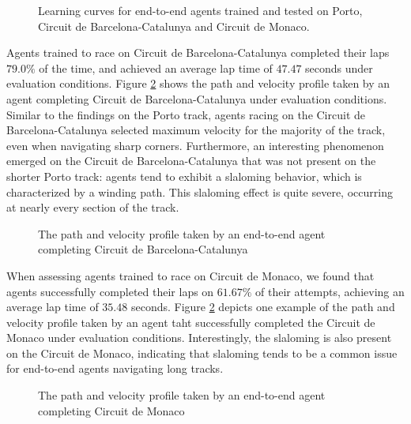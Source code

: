 \begin{figure}[htb!]
    \centering
    
    \caption[Learning curves for end-to-end agents trained and tested on Porto, Circuit de Barcelona-Catalunya and Circuit de Monaco]{Learning curves for end-to-end agents trained and tested on Porto, Circuit de Barcelona-Catalunya and Circuit de Monaco.}
    \label{fig:ete_reward}
\end{figure}


Agents trained to race on Circuit de Barcelona-Catalunya completed their laps $79.0\%$ of the time, and achieved an average lap time of $47.47$ seconds under evaluation conditions.
Figure \ref{fig:ete_esp} shows the path and velocity profile taken by an agent completing Circuit de Barcelona-Catalunya under evaluation conditions.
Similar to the findings on the Porto track, agents racing on the Circuit de Barcelona-Catalunya selected maximum velocity for the majority of the track, even when navigating sharp corners. 
Furthermore, an interesting phenomenon emerged on the Circuit de Barcelona-Catalunya that was not present on the shorter Porto track: agents tend to exhibit a slaloming behavior, which is characterized by a winding path. 
This slaloming effect is quite severe, occurring at nearly every section of the track.


\begin{figure}[htb!]
    \centering
    
    \caption[The path and velocity profile taken by an end-to-end agent completing Circuit de Barcelona-Catalunya]{The path and velocity profile taken by an end-to-end agent completing Circuit de Barcelona-Catalunya}
    \label{fig:ete_esp}
\end{figure}

When assessing agents trained to race on Circuit de Monaco, we found that agents successfully completed their laps on $61.67\%$ of their attempts, achieving an average lap time of $35.48$ seconds. 
Figure \ref{fig:ete_esp} depicts one example of the path and velocity profile taken by an agent taht successfully completed the Circuit de Monaco under evaluation conditions. 
Interestingly, the slaloming is also present on the Circuit de Monaco, indicating that slaloming tends to be a common issue for end-to-end agents navigating long tracks.

\begin{figure}[htb!]
    \centering
    
    \caption[The path and velocity profile taken by an end-to-end agent completing Circuit de Monaco]{The path and velocity profile taken by an end-to-end agent completing Circuit de Monaco}
    \label{fig:ete_mco}
\end{figure}






